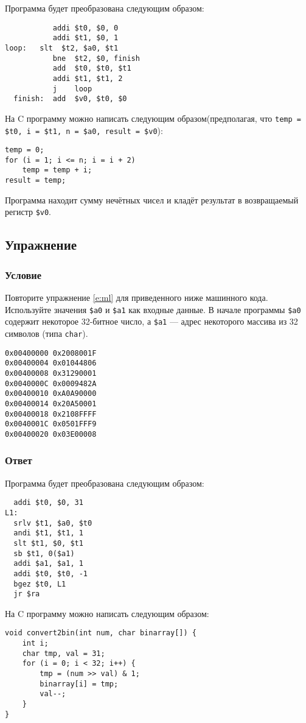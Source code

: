 \documentclass[12pt]{article}
\newenvironment{e}[1][dummy label]{
    \subsection{Упражнение}\label{#1}
    \subsubsection*{Условие}
    }{
    \subsubsection*{Ответ}
}
\newcommand{\eref}[1]{\hyperref[{e:#1}]{\nameref*{e:#1} \ref*{e:#1}}}
\begin{document}
    Программа будет преобразована следующим образом:

    \begin{verbatim}
           addi $t0, $0, 0
           addi $t1, $0, 1
loop:   slt  $t2, $a0, $t1
           bne  $t2, $0, finish
           add  $t0, $t0, $t1
           addi $t1, $t1, 2
           j    loop
  finish:  add  $v0, $t0, $0
    \end{verbatim}

    На C программу можно написать следующим образом(предполагая, что \texttt{temp = \$t0, i = \$t1, n = \$a0, result = \$v0}):
    \begin{verbatim}
temp = 0;
for (i = 1; i <= n; i = i + 2)
    temp = temp + i;
result = temp;
    \end{verbatim}

    Программа находит сумму нечётных чисел и кладёт результат в возвращаемый регистр \texttt{\$v0}.

    \newpage

    \begin{e}
        Повторите упражнение \eref{ml} для приведенного ниже машинного кода. Используйте значения \texttt{\$a0} и \texttt{\$a1} как входные данные. В начале программы \texttt{\$a0} содержит некоторое 32-битное число, а \texttt{\$a1} --- адрес некоторого массива из 32 символов (типа \texttt{char}).

        \begin{verbatim}
0x00400000 0x2008001F
0x00400004 0x01044806
0x00400008 0x31290001
0x0040000C 0x0009482A
0x00400010 0xA0A90000
0x00400014 0x20A50001
0x00400018 0x2108FFFF
0x0040001C 0x0501FFF9
0x00400020 0x03E00008
        \end{verbatim}
    \end{e}

    Программа будет преобразована следующим образом:

    \begin{verbatim}
  addi $t0, $0, 31
L1:
  srlv $t1, $a0, $t0
  andi $t1, $t1, 1
  slt $t1, $0, $t1
  sb $t1, 0($a1)
  addi $a1, $a1, 1
  addi $t0, $t0, -1
  bgez $t0, L1
  jr $ra
    \end{verbatim}

    На C программу можно написать следующим образом:
    \begin{verbatim}
void convert2bin(int num, char binarray[]) {
    int i;
    char tmp, val = 31;
    for (i = 0; i < 32; i++) {
        tmp = (num >> val) & 1;
        binarray[i] = tmp;
        val--;
    }
}
    \end{verbatim}
\end{document}
